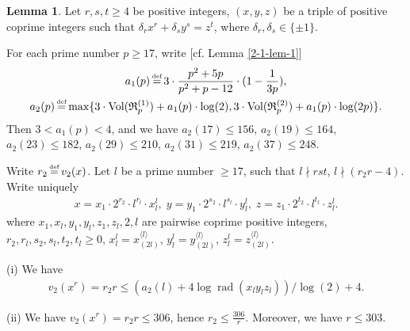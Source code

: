\documentclass[a4paper, 12pt]{article}
\DeclareMathOperator{\defeq}{\overset{\text{\tiny{def}}}{=}}
\DeclareMathOperator{\rad}{\text{rad}}
\DeclareMathOperator{\Vol}{\text{Vol}}
\newcommand{\lagl}{\langle l \rangle}
\numberwithin{equation}{section}
\theoremstyle{definition}
\newtheorem{lem}[thm]{Lemma}
\begin{document}
\begin{lem}  \label{2-2-lem-2}
Let $r,s,t \ge 4$ be positive integers, $(x,y,z)$ be a triple of positive coprime integers such that $\delta_r x^r + \delta_s y^s =  z^t$, where $\delta_r,\delta_s \in \{\pm 1\}$.

For each prime number $p\ge 17$, write [cf. Lemma \ref{2-1-lem-1}]
\small\begin{gather*}
a_1(p) \defeq 3 \cdot \frac{p^2+5p}{p^2+p-12}\cdot (1-\frac{1}{3p}),  \\
a_2(p) \defeq \max\{3 \cdot \Vol(\mathfrak R_p^{(1)}) + a_1(p)\cdot \log(2), 3 \cdot \Vol(\mathfrak R_p^{(2)}) + a_1(p)\cdot \log(2p) \} .
\end{gather*}\normalsize
Then $3 < a_1(p) < 4$, and we have $a_2(17) \le 156$, $a_2(19) \le 164$, $a_2(23) \le 182$, $a_2(29) \le 210$, $a_2(31) \le 219$, $a_2(37) \le 248$.

Write $r_2 \defeq v_2(x)$.
Let $l$ be a prime number $\ge 17$, such that $l\nmid rst$, $l\nmid (r_2 r - 4)$. 
Write uniquely \small\begin{gather*}  
x = x_1 \cdot 2^{r_2} \cdot l^{r_l} \cdot x_l^{l}, \;
y = y_1 \cdot 2^{s_2} \cdot l^{s_l} \cdot y_l^{l}, \;
z = z_1 \cdot 2^{t_2} \cdot l^{t_l} \cdot z_l^{l}.
\end{gather*}\normalsize
where $x_1, x_l, y_1, y_l, z_1, z_l, 2, l$ are pairwise coprime positive integers, 
$r_2, r_l, s_2, s_l, t_2, t_l \ge 0$, 
$x_l^l = x_{(2l)}^{\lagl}$, $y_l^l = y_{(2l)}^{\lagl}$, $z_l^l = z_{(2l)}^{\lagl}$.

(i) We have 
\small\begin{align}  \label{2-2-eq5}
v_2(x^r) = r_2 r \le ( a_2(l) + 4\log\rad(x_l y_l z_l) ) / \log(2) + 4 .
\end{align}\normalsize


(ii) We have $v_2(x^r) = r_2r \le 306$, hence $r_2 \le \frac{306}{r}$.
Moreover, we have $r \le 303$.
\end{lem}
\end{document}
